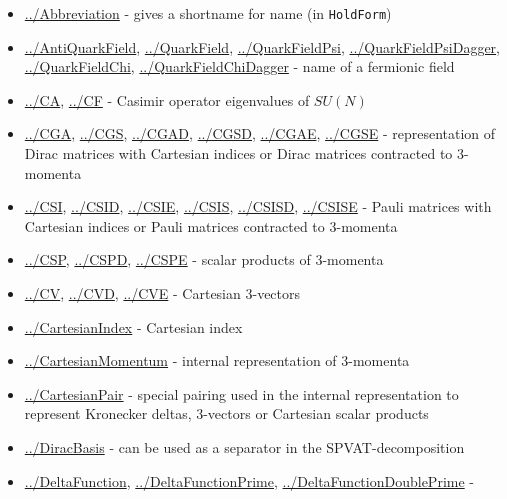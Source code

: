 \documentclass[../FeynCalcManual.tex]{subfiles}
\begin{document}
\begin{itemize}
\tightlist
\item
  \hyperlink{../abbreviation}{../Abbreviation} - gives a shortname for
  name (in \texttt{HoldForm})
\item
  \hyperlink{../antiquarkfield}{../AntiQuarkField},
  \hyperlink{../quarkfield}{../QuarkField},
  \hyperlink{../quarkfieldpsi}{../QuarkFieldPsi},
  \hyperlink{../quarkfieldpsidagger}{../QuarkFieldPsiDagger},
  \hyperlink{../quarkfieldchi}{../QuarkFieldChi},
  \hyperlink{../quarkfieldchidagger}{../QuarkFieldChiDagger} - name of a
  fermionic field
\item
  \hyperlink{../ca}{../CA}, \hyperlink{../cf}{../CF} - Casimir operator
  eigenvalues of \(SU(N)\)
\item
  \hyperlink{../cga}{../CGA}, \hyperlink{../cgs}{../CGS},
  \hyperlink{../cgad}{../CGAD}, \hyperlink{../cgsd}{../CGSD},
  \hyperlink{../cgae}{../CGAE}, \hyperlink{../cgse}{../CGSE} -
  representation of Dirac matrices with Cartesian indices or Dirac
  matrices contracted to \(3\)-momenta
\item
  \hyperlink{../csi}{../CSI}, \hyperlink{../csid}{../CSID},
  \hyperlink{../csie}{../CSIE}, \hyperlink{../csis}{../CSIS},
  \hyperlink{../csisd}{../CSISD}, \hyperlink{../csise}{../CSISE} - Pauli
  matrices with Cartesian indices or Pauli matrices contracted to
  \(3\)-momenta
\item
  \hyperlink{../csp}{../CSP}, \hyperlink{../cspd}{../CSPD},
  \hyperlink{../cspe}{../CSPE} - scalar products of \(3\)-momenta
\item
  \hyperlink{../cv}{../CV}, \hyperlink{../cvd}{../CVD},
  \hyperlink{../cve}{../CVE} - Cartesian \(3\)-vectors
\item
  \hyperlink{../cartesianindex}{../CartesianIndex} - Cartesian index
\item
  \hyperlink{../cartesianmomentum}{../CartesianMomentum} - internal
  representation of \(3\)-momenta
\item
  \hyperlink{../cartesianpair}{../CartesianPair} - special pairing used
  in the internal representation to represent Kronecker deltas,
  \(3\)-vectors or Cartesian scalar products
\item
  \hyperlink{../diracbasis}{../DiracBasis} - can be used as a separator
  in the SPVAT-decomposition
\item
  \hyperlink{../deltafunction}{../DeltaFunction},
  \hyperlink{../deltafunctionprime}{../DeltaFunctionPrime},
  \hyperlink{../deltafunctiondoubleprime}{../DeltaFunctionDoublePrime} -

\end{itemize}
\end{document}
